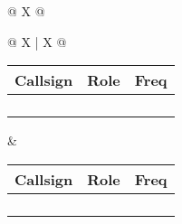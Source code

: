 {\begin{tabularx}{\linewidth}{ @{} X @{} }
{\begin{tabularx}{\linewidth}{@{} X | X @{}}
{\begin{tabularx}{\linewidth}{@{} *{3}X @{}}
			Callsign & Role & Freq\\[-4ex] \midrule
			\hfill & \hfill & \hfill\\ \midrule
			\hfill & \hfill & \hfill\\ \midrule
			\hfill & \hfill & \hfill\\ \midrule
			\hfill & \hfill & \hfill\\
		\end{tabularx}} &
		{\begin{tabularx}{\linewidth}{@{} *{3}X @{}}
			Callsign & Role & Freq\\[-4ex] \midrule	
			\hfill & \hfill & \hfill\\ \midrule
			\hfill & \hfill & \hfill\\ \midrule
			\hfill & \hfill & \hfill\\ \midrule
			\hfill & \hfill & \hfill\\	
		\end{tabularx}}\\
	\end{tabularx}}\\ \midrule
	\\[-4ex] \midrule

\end{tabularx}
}